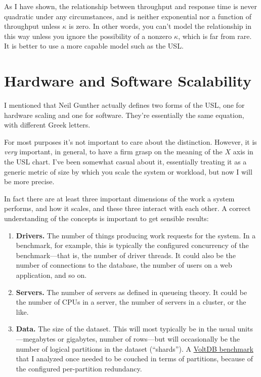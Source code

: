 \documentclass{vivid_layout}
\begin{document}
As I have shown, the relationship between throughput and response
time is never quadratic under any circumstances, and is neither exponential 
nor a function of throughput unless $\kappa$ is zero.
In other words, you can't model the relationship in this way unless you
ignore the possibility of a nonzero $\kappa$, which is far from
rare. It is better to use a more capable model such as the USL.

\section{Hardware and Software Scalability}

I mentioned that Neil Gunther actually defines two forms of the USL, one for
hardware scaling and one for software. They're essentially the same equation,
with different Greek letters.

For most purposes it's not important to care about the distinction. However, it
is {\itshape very} important, in general, to have a firm grasp on the meaning of
the $X$ axis in the USL chart. I've been somewhat casual about it, essentially
treating it as a generic metric of size by which you scale the system or
workload, but now I will be more precise.

In fact there are at least three important dimensions of the work a system
performs, and how it scales, and these three interact with each other. A correct
understanding of the concepts is important to get sensible results:

\begin{enumerate}
\item {\bfseries Drivers.} The number of things producing work requests for the
system. In a benchmark, for example, this is typically the configured
concurrency of the benchmark---that is, the number of driver threads. It could
also be the number of connections to the database, the number of users on a web
application, and so on.
\item {\bfseries Servers.} The number of servers as defined in queueing theory. It could be the
number of CPUs in a server, the number of servers in a cluster, or the like.
\item {\bfseries Data.} The size of the dataset. This will most typically be in the usual
units---megabytes or gigabytes, number of rows---but will occasionally be the
number of logical partitions in the dataset (``shards''). A
\href{https://www.percona.com/blog/2011/02/28/is-voltdb-really-as-scalable-as-they-claim/}{VoltDB
benchmark} that I analyzed once needed to be couched in terms of partitions,
because of the configured per-partition redundancy.
\end{enumerate}
\end{document}

